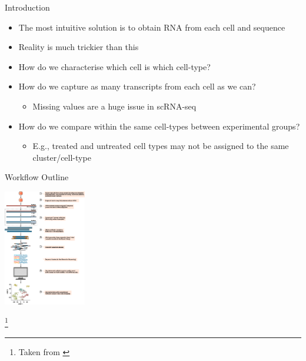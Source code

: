 \documentclass[aspectratio=169,11pt]{beamer}
\newcommand\blfootnote[1]{%
  \begingroup
  \renewcommand\thefootnote{}\footnote{#1}%
  \addtocounter{footnote}{-1}%
  \endgroup
}
\begin{document}
\begin{frame}{Introduction}

	\begin{itemize}
		\item The most intuitive solution is to obtain RNA from each cell and sequence
		\item Reality is much trickier than this
		\pause
		\item How do we characterise which cell is which cell-type?
		\item How do we capture as many transcripts from each cell as we can?
		\begin{itemize}
			\item Missing values are a huge issue in scRNA-seq
		\end{itemize}
		\item How do we compare within the same cell-types between experimental groups?
		\begin{itemize}
			\item E.g., treated and untreated cell types may not be assigned to the same cluster/cell-type
		\end{itemize}
	\end{itemize}

\end{frame}


\begin{frame}{Workflow Outline}

	\begin{center}
	\includegraphics[width=0.27\textwidth]{figures/scRNAWorkflow.png} 
	\end{center}
	
	\blfootnote{Taken from \cite{pmid28821273}}

\end{frame}
\end{document}
